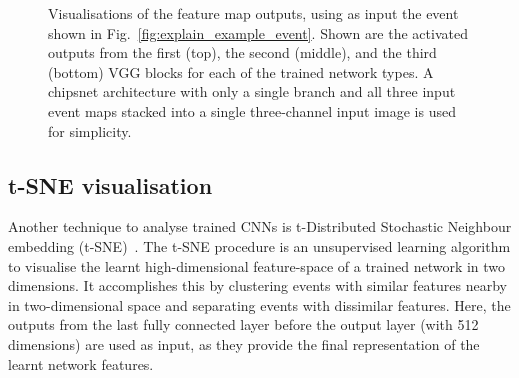\begin{figure}
{    }
    \quad
    \caption[Visualisations of trained feature map outputs]
    {Visualisations of the feature map outputs, using as input the event shown in
        Fig.~\ref{fig:explain_example_event}. Shown are the activated outputs from the first
        (top), the second (middle), and the third (bottom) VGG blocks for each of the trained
        network types. A chipsnet architecture with only a single branch and all three input event
        maps stacked into a single three-channel input image is used for simplicity.}
    \label{fig:cnn_visualisations}
\end{figure}

\subsection*{t-SNE visualisation} %

Another technique to analyse trained CNNs is t-Distributed Stochastic Neighbour embedding
(t-SNE)~\cite{maaten2008}. The t-SNE procedure is an unsupervised learning algorithm to visualise
the learnt high-dimensional feature-space of a trained network in two dimensions. It accomplishes
this by clustering events with similar features nearby in two-dimensional space and separating
events with dissimilar features. Here, the outputs from the last fully connected layer before the
output layer (with 512 dimensions) are used as input, as they provide the final representation of
the learnt network features.

